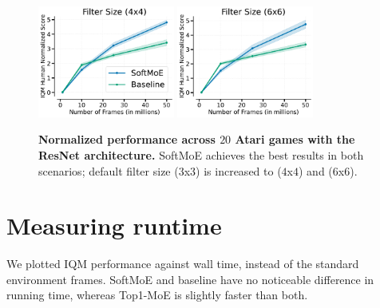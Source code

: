 \begin{figure}[!h]
    \centering
    \includegraphics[width=0.4\textwidth]{figures/MoesFilter4x4.pdf}%
    \includegraphics[width=0.4\textwidth]{figures/MoesFilter6x6.pdf}%
    \caption{\textbf{Normalized performance across $20$ Atari games with the ResNet architecture.} SoftMoE achieves the best results in both scenarios; default filter size ($3$x$3$) is increased to ($4$x$4$) and ($6$x$6$).}
\end{figure}

\section{Measuring runtime}

We plotted IQM performance against wall time, instead of the standard environment frames. SoftMoE and baseline have no noticeable difference in running time, whereas Top1-MoE is slightly faster than both.


